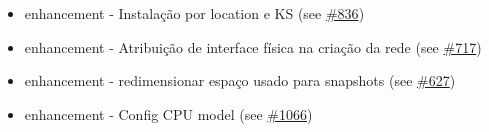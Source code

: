 \begin{itemize}
    \item enhancement - Instalação por location e KS (see \href{https://srcmaster.eurotux.com/pm/p/etva/ticket/836}{\#836})
    \item enhancement - Atribuição de interface física na criação da rede (see \href{https://srcmaster.eurotux.com/pm/p/etva/ticket/717}{\#717})
    \item enhancement - redimensionar espaço usado para snapshots (see \href{https://srcmaster.eurotux.com/pm/p/etva/ticket/627}{\#627})
    \item enhancement - Config CPU model (see \href{https://srcmaster.eurotux.com/pm/p/etva/ticket/1066}{\#1066})
\end{itemize}
